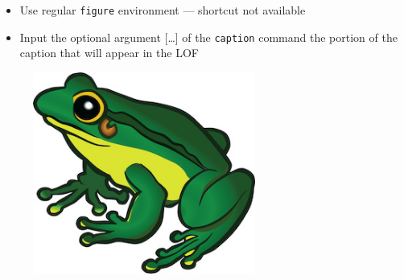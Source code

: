 \documentclass[phd]{ndsu-thesis-2022}
\begin{document}
\begin{itemize}
\item Use regular \texttt{figure} environment --- shortcut not available
\item Input the optional argument [\ldots] of the \texttt{caption} command the portion of the caption that will appear in the LOF
\end{itemize}

\begin{figure}[p]%
\setlength\belowcaptionskip{-20pt}%
\begin{center}
\includegraphics[width=0.65\textwidth]{frog.jpg}
\end{center}

\end{figure}
\end{document}

